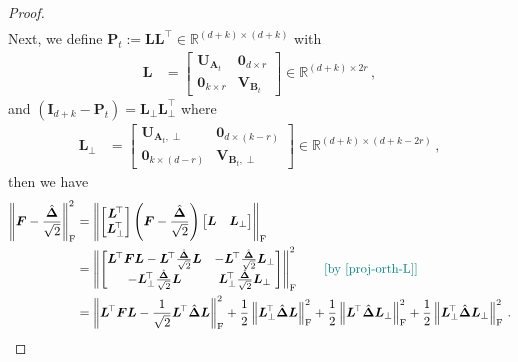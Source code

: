 \begin{proof}
\begin{align}
\end{align}
Next, we define $\mathbf{P}_t:=\bm L \bm L^{\!\top} \in \mathbb{R}^{(d+k) \times (d+k)}$ with
\begin{align*}
    \bm L & = \begin{bmatrix}
        \bm U_{\bm A_t} & \bm 0_{d\times r} \\
        \bm 0_{k\times r} & \bm V_{\bm B_t}
    \end{bmatrix}\in\mathbb{R}^{(d+k)\times 2r}\,,
\end{align*}
and $\left(\bm I_{d+k}-\mathbf{P}_t\right)=\bm L_\perp \bm L_\perp^{\!\top}$ where
\begin{align*}
    \bm L_\perp & = \begin{bmatrix}
        \bm U_{\bm A_t,\perp} & \bm 0_{d\times (k-r)} \\
        \bm 0_{k\times (d-r)} & \bm V_{\bm B_t,\perp}
    \end{bmatrix}\in\mathbb{R}^{(d+k)\times (d+k-2r)}\,,
\end{align*}
then we have
\begin{align}
    \left\|\bm F - \frac{\hat{\bm \Delta}}{\sqrt{2}}\right\|^2_{\rm F} & = \left\|\begin{bmatrix}
        \bm L^{\!\top}\\\bm L^{\!\top}_\perp
    \end{bmatrix}\left(\bm F - \frac{\hat{\bm \Delta}}{\sqrt{2}}\right)\begin{bmatrix}
        \bm L&\bm L_\perp
    \end{bmatrix}\right\|_{\rm F}\nonumber\\
    & = \left\|\begin{bmatrix}
        \bm L^{\!\top}\bm F\bm L - \bm L^{\!\top}\frac{\hat{\bm \Delta}}{\sqrt{2}}\bm L & - \bm L^{\!\top}\frac{\hat{\bm \Delta}}{\sqrt{2}}\bm L_\perp\\
        - \bm L_\perp^{\!\top}\frac{\hat{\bm \Delta}}{\sqrt{2}}\bm L & \bm L_\perp^{\!\top}\frac{\hat{\bm \Delta}}{\sqrt{2}}\bm L_\perp
    \end{bmatrix}\right\|^2_{\rm F}\nonumber\tag*{\color{teal}[by \cref{proj-orth-L}]}\\
    & = \left\|\bm L^{\!\top}\bm F\bm L - \frac{1}{\sqrt{2}}\bm L^{\!\top}\hat{\bm \Delta}\bm L\right\|^2_{\rm F} + \frac{1}{2}\left\|\bm L_\perp^{\!\top}\hat{\bm \Delta}\bm L\right\|^2_{\rm F} + \frac{1}{2}\left\|\bm L^{\!\top}\hat{\bm \Delta}\bm L_\perp\right\|^2_{\rm F} + \frac{1}{2}\left\|\bm L_\perp^{\!\top}\hat{\bm \Delta}\bm L_\perp\right\|^2_{\rm F}\,.\label{qqqq}

\end{align}
\end{proof}
